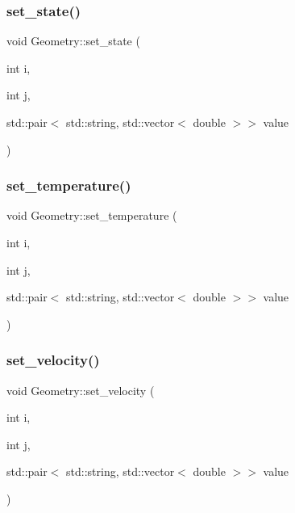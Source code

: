 \subsubsection{\texorpdfstring{set\_state()}{set\_state()}}
{\footnotesize\ttfamily void Geometry\+::set\+\_\+state (\begin{DoxyParamCaption}\item[{int}]{i,  }\item[{int}]{j,  }\item[{std\+::pair$<$ std\+::string, std\+::vector$<$ double $>$$>$}]{value }\end{DoxyParamCaption})}

\mbox{\label{classGeometry_af8ec06bbfcf1d46d71187dd2e9935102}} 
\subsubsection{\texorpdfstring{set\_temperature()}{set\_temperature()}}
{\footnotesize\ttfamily void Geometry\+::set\+\_\+temperature (\begin{DoxyParamCaption}\item[{int}]{i,  }\item[{int}]{j,  }\item[{std\+::pair$<$ std\+::string, std\+::vector$<$ double $>$$>$}]{value }\end{DoxyParamCaption})}

\mbox{\label{classGeometry_a5dd3a0b0d6b64e7a21b19e95df791054}} 
\subsubsection{\texorpdfstring{set\_velocity()}{set\_velocity()}}
{\footnotesize\ttfamily void Geometry\+::set\+\_\+velocity (\begin{DoxyParamCaption}\item[{int}]{i,  }\item[{int}]{j,  }\item[{std\+::pair$<$ std\+::string, std\+::vector$<$ double $>$$>$}]{value }\end{DoxyParamCaption})}

\mbox{\label{classGeometry_aae6f83aaf9fa7f35bd21fdb8e1141fe3}} 

